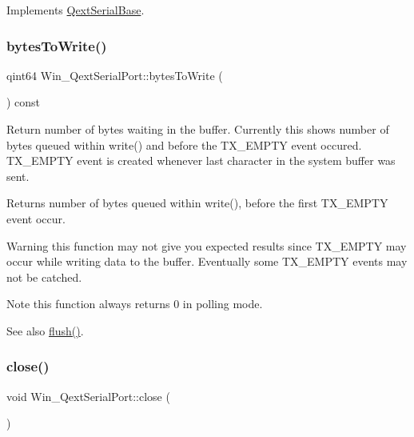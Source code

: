 Implements \mbox{\hyperlink{class_qext_serial_base}{Qext\+Serial\+Base}}.

\mbox{\label{class_win___qext_serial_port_a0cb24ec851418ebf6be7cd1d407e5592}} 
\subsubsection{\texorpdfstring{bytes\+To\+Write()}{bytesToWrite()}}
{\footnotesize\ttfamily qint64 Win\+\_\+\+Qext\+Serial\+Port\+::bytes\+To\+Write (\begin{DoxyParamCaption}{ }\end{DoxyParamCaption}) const\hspace{0.3cm}{\ttfamily [virtual]}}

Return number of bytes waiting in the buffer. Currently this shows number of bytes queued within write() and before the T\+X\+\_\+\+E\+M\+P\+TY event occured. T\+X\+\_\+\+E\+M\+P\+TY event is created whenever last character in the system buffer was sent.

\begin{DoxyReturn}{Returns}
number of bytes queued within write(), before the first T\+X\+\_\+\+E\+M\+P\+TY event occur.
\end{DoxyReturn}
\begin{DoxyWarning}{Warning}
this function may not give you expected results since T\+X\+\_\+\+E\+M\+P\+TY may occur while writing data to the buffer. Eventually some T\+X\+\_\+\+E\+M\+P\+TY events may not be catched.
\end{DoxyWarning}
\begin{DoxyNote}{Note}
this function always returns 0 in polling mode.
\end{DoxyNote}
\begin{DoxySeeAlso}{See also}
\mbox{\hyperlink{class_win___qext_serial_port_ac72e737e24bda9c14a9388eac8ef2622}{flush()}}. 
\end{DoxySeeAlso}
\mbox{\label{class_win___qext_serial_port_afd2a4f6a94c877e5ae2dbf742af61b1d}} 
\subsubsection{\texorpdfstring{close()}{close()}}
{\footnotesize\ttfamily void Win\+\_\+\+Qext\+Serial\+Port\+::close (\begin{DoxyParamCaption}{ }\end{DoxyParamCaption})\hspace{0.3cm}{\ttfamily [virtual]}}

